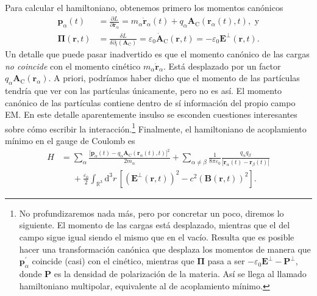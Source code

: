 Para calcular el hamiltoniano, obtenemos primero los momentos canónicos
\begin{subequations}
    \begin{align}
        \mathbf{p}_\alpha(t) &= \frac{\partial L}{\partial \mathbf{r}_\alpha} = m_\alpha\dot{\mathbf{r}}_\alpha(t) + q_\alpha \mathbf{A}_\mathrm{C}(\mathbf{r}_\alpha(t), t),\text{ y}\\
        \boldsymbol{\Pi}(\mathbf{r}, t) &= \frac{\delta L}{\delta \partial_t(\mathbf{A}_\mathrm{C})} = \varepsilon_0 \dot{\mathbf{A}}_\mathrm{C}(\mathbf{r}, t) = -\varepsilon_0 \mathbf{E}^\perp(\mathbf{r}, t).
    \end{align}
\end{subequations}
Un detalle que puede pasar inadvertido es que el momento canónico de las cargas \emph{no coincide} con el momento cinético \(m_\alpha \dot{\mathbf{r}}_\alpha\). Está desplazado por un factor \(q_\alpha\mathbf{A}_\mathrm{C}(\mathbf{r}_\alpha)\). A priori, podríamos haber dicho que el momento de las partículas tendría que ver con las partículas únicamente, pero no es así. El momento canónico de las partículas contiene dentro de sí información del propio campo EM. En este detalle aparentemente insulso se esconden cuestiones interesantes sobre cómo escribir la interacción.\footnote{No profundizaremos nada más, pero por concretar un poco, diremos lo siguiente. El momento de las cargas está desplazado, mientras que el del campo sigue igual siendo el mismo que en el vacío. Resulta que es posible hacer una transformación canónica que desplaza los momentos de manera que \(\mathbf{p}_\alpha^\prime\) coincide (casi) con el cinético, mientras que \(\boldsymbol{\Pi}\) pasa a ser \(-\varepsilon_0 \mathbf{E}^\perp - \mathbf{P}^\perp\), donde \(\mathbf{P}\) es la densidad de polarización de la materia. Así se llega al llamado hamiltoniano multipolar, equivalente al de acoplamiento mínimo.} Finalmente, el hamiltoniano de acoplamiento mínimo en el gauge de Coulomb es
\begin{align}
    H &= \sum_\alpha \frac{\big[\mathbf{p}_\alpha(t) - q_\alpha \mathbf{A}_\mathrm{C}(\mathbf{r}_\alpha(t), t)\big]^2}{2m_\alpha} + \sum_{\alpha\neq\beta} \frac{1}{8\pi\varepsilon_0} \frac{q_\alpha q_\beta}{\left|\mathbf{r}_\alpha(t) - \mathbf{r}_\beta(t)\right|} \\
    \nonumber
    &\phantom{=} + \frac{\varepsilon_0}{2} \int_{\mathbb{R}^3}\mathrm{d}^3r\, \left[\left(\mathbf{E}^\perp(\mathbf{r}, t)\right)^2 - c^2\left(\mathbf{B}(\mathbf{r}, t)\right)^2\right] .
\end{align}



